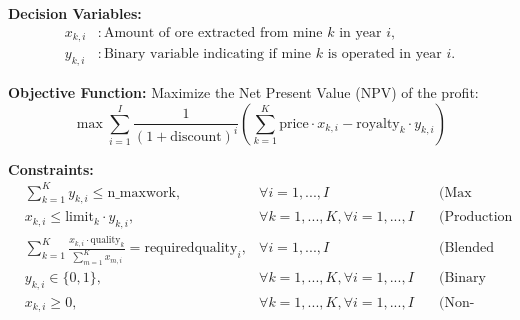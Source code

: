 \documentclass{article}
\begin{document}
\textbf{Decision Variables:}
\[
\begin{align*}
x_{k,i} & : \text{Amount of ore extracted from mine } k \text{ in year } i, \\
y_{k,i} & : \text{Binary variable indicating if mine } k \text{ is operated in year } i.
\end{align*}
\]

\textbf{Objective Function:}
Maximize the Net Present Value (NPV) of the profit:
\[
\max \sum_{i=1}^{I} \frac{1}{(1 + \text{discount})^i} \left( \sum_{k=1}^{K} \text{price} \cdot x_{k,i} - \text{royalty}_k \cdot y_{k,i} \right)
\]

\textbf{Constraints:}
\begin{align*}
& \sum_{k=1}^{K} y_{k,i} \leq \text{n\_maxwork}, & \forall i = 1,...,I \quad & \text{(Max number of mines operated)} \\
& x_{k,i} \leq \text{limit}_k \cdot y_{k,i}, & \forall k = 1,...,K, \forall i = 1,...,I \quad & \text{(Production limit based on operation)} \\
& \sum_{k=1}^{K} \frac{x_{k,i} \cdot \text{quality}_k}{\sum_{m=1}^{K} x_{m,i}} = \text{requiredquality}_i, & \forall i = 1,...,I \quad & \text{(Blended quality requirement)} \\
& y_{k,i} \in \{0, 1\}, & \forall k = 1,...,K, \forall i = 1,...,I \quad & \text{(Binary operation decision)} \\
& x_{k,i} \geq 0, & \forall k = 1,...,K, \forall i = 1,...,I \quad & \text{(Non-negativity)}
\end{align*}
\end{document}
